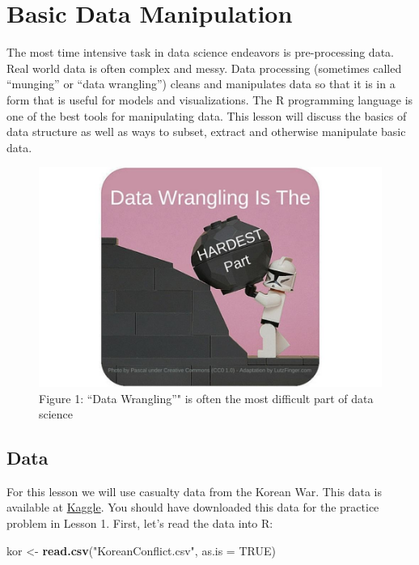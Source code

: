 \documentclass[]{book}
\newenvironment{Shaded}{\begin{snugshade}}{\end{snugshade}}
\newcommand{\KeywordTok}[1]{\textcolor[rgb]{0.13,0.29,0.53}{\textbf{{#1}}}}
\newcommand{\DataTypeTok}[1]{\textcolor[rgb]{0.13,0.29,0.53}{{#1}}}
\newcommand{\StringTok}[1]{\textcolor[rgb]{0.31,0.60,0.02}{{#1}}}
\newcommand{\OtherTok}[1]{\textcolor[rgb]{0.56,0.35,0.01}{{#1}}}
\newcommand{\NormalTok}[1]{{#1}}
\begin{document}
\chapter{Basic Data Manipulation}\label{basic-data-manipulation}

The most time intensive task in data science endeavors is pre-processing
data. Real world data is often complex and messy. Data processing
(sometimes called ``munging'' or ``data wrangling'') cleans and
manipulates data so that it is in a form that is useful for models and
visualizations. The R programming language is one of the best tools for
manipulating data. This lesson will discuss the basics of data structure
as well as ways to subset, extract and otherwise manipulate basic data.

\begin{figure}[htbp]
\centering
\includegraphics{dataWrangling.jpg}
\caption{Figure 1: ``Data Wrangling''" is often the most difficult part
of data science}
\end{figure}

\section{Data}\label{data}

For this lesson we will use casualty data from the Korean War. This data
is available at \href{https://www.kaggle.com/datasets}{Kaggle}. You
should have downloaded this data for the practice problem in Lesson 1.
First, let's read the data into R:

\begin{Shaded}
\begin{Highlighting}[]
\NormalTok{kor <-}\StringTok{ }\KeywordTok{read.csv}\NormalTok{(}\StringTok{"KoreanConflict.csv"}\NormalTok{, }\DataTypeTok{as.is =} \OtherTok{TRUE}\NormalTok{)}
\end{Highlighting}
\end{Shaded}
\end{document}
